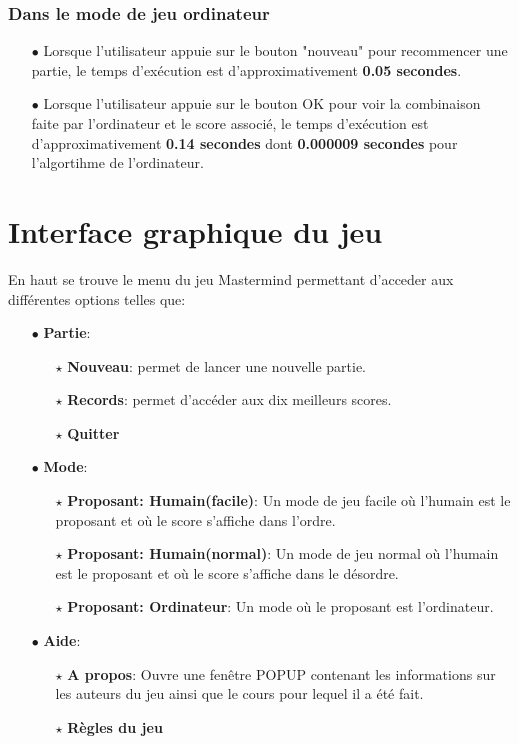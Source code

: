\documentclass[a4paper, 11pt, oneside]{article}
\begin{document}
\subsubsection{Dans le mode de jeu ordinateur}
\begin{itemize}
    \item[$\bullet$] Lorsque l'utilisateur appuie sur le bouton "nouveau" pour recommencer une partie, le temps d'exécution est d'approximativement \textbf{0.05 secondes}.
    \item[$\bullet$] Lorsque l'utilisateur appuie sur le bouton OK pour voir la combinaison faite par l'ordinateur et le score associé, le temps d'exécution est d'approximativement \textbf{0.14 secondes} dont \textbf{0.000009 secondes} pour l'algortihme de l'ordinateur.
\end{itemize}

\section{Interface graphique du jeu}
En haut se trouve le menu du jeu Mastermind permettant d'acceder aux différentes options telles que:
\begin{itemize}
    \item[$\bullet$] \textbf{Partie}: 
    \begin{itemize}
        \item[$\star$] \textbf{Nouveau}: permet de lancer une nouvelle partie.
        \item[$\star$] \textbf{Records}: permet d'accéder aux dix meilleurs scores.
        \item[$\star$] \textbf{Quitter}
    \end{itemize}
    \item[$\bullet$] \textbf{Mode}:
        \begin{itemize}
            \item[$\star$] \textbf{Proposant: Humain(facile)}: Un mode de jeu facile où l'humain est le proposant et où le score s'affiche dans l'ordre.
            \item[$\star$] \textbf{Proposant: Humain(normal)}: Un mode de jeu normal où l'humain est le proposant et où le score s'affiche dans le désordre.
            \item[$\star$] \textbf{Proposant: Ordinateur}: Un mode où le proposant est l'ordinateur.
        \end{itemize}
    \item[$\bullet$] \textbf{Aide}:
    \begin{itemize}
        \item[$\star$] \textbf{A propos}: Ouvre une fenêtre POPUP contenant les informations sur les auteurs du jeu ainsi que le cours pour lequel il a été fait.
        \item[$\star$] \textbf{Règles du jeu}
    \end{itemize}
\end{itemize} 
\end{document}
